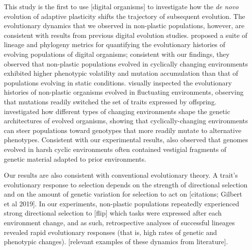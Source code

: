 This study is the first to use [digital organisms] to investigate how the \textit{de novo} evolution of adaptive plasticity shifts the trajectory of subsequent evolution.
The evolutionary dynamics that we observed in non-plastic populations, however, are consistent with results from previous digital evolution studies. %
\cite{dolson_interpreting_2020} proposed a suite of lineage and phylogeny metrics for quantifying the evolutionary histories of evolving populations of digital organisms; consistent with our findings, they observed that non-plastic populations evolved in cyclically changing environments exhibited higher phenotypic volatility and mutation accumulation than that of populations evolving in static conditions.
\cite{lalejini_evolutionary_2016} visually inspected the evolutionary histories of non-plastic organisms evolved in fluctuating environments, observing that mutations readily switched the set of traits expressed by offspring.
\cite{canino-koning_evolution_2016} investigated how different types of changing environments shape the genetic architectures of evolved organisms, showing that cyclically-changing environments can steer populations toward genotypes that more readily mutate to alternative phenotypes.
Consistent with our experimental results, \cite{canino-koning_evolution_2016} also observed that genomes evolved in harsh cyclic environments often contained vestigial fragments of genetic material adapted to prior environments.

Our results are also consistent with conventional evolutionary theory.
A trait's evolutionary response to selection depends on the strength of directional selection and on the amount of genetic variation for selection to act on [citations; Gilbert et al 2019].
In our experiments, non-plastic populations repeatedly experienced strong directional selection to [flip] which tasks were expressed after each environment change, and as such, retrospective analyses of successful lineages revealed rapid evolutionary responses (that is, high rates of genetic and phenotypic changes).
[relevant examples of these dynamics from literature].

